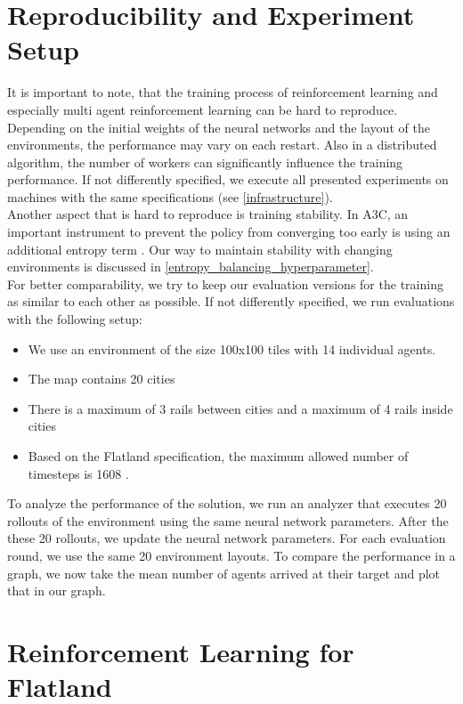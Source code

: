 \section[Reproducibility]{Reproducibility and Experiment Setup}\label{reproducability}
It is important to note, that the training process of reinforcement learning and especially multi agent reinforcement learning can be hard to reproduce. Depending on the initial weights of the neural networks and the layout of the environments, the performance may vary on each restart. Also in a distributed algorithm, the number of workers can significantly influence the training performance. If not differently specified, we execute all presented experiments on machines with the same specifications (see \autoref{infrastructure}).\\
Another aspect that is hard to reproduce is training stability. In A3C, an important instrument to prevent the policy from converging too early is using an additional entropy term \cite{a3c}. Our way to maintain stability with changing environments is discussed in \autoref{entropy_balancing_hyperparameter}.\\
For better comparability, we try to keep our evaluation versions for the training as similar to each other as possible. If not differently specified, we run evaluations with the following setup:
\begin{itemize}
	\item We use an environment of the size 100x100 tiles with 14 individual agents.
	\item The map contains 20 cities
	\item There is a maximum of 3 rails between cities and a maximum of 4 rails inside cities
	\item Based on the Flatland specification, the maximum allowed number of timesteps is 1608 \cite{flatland_spec}.
\end{itemize}
To analyze the performance of the solution, we run an analyzer that executes 20 rollouts of the environment using the same neural network parameters. After the these 20 rollouts, we update the neural network parameters. For each evaluation round, we use the same 20 environment layouts. 
To compare the performance in a graph, we now take the mean number of agents arrived at their target and plot that in our graph.
\section[RL for Flatland]{Reinforcement Learning for Flatland}\label{rl_flatland}
